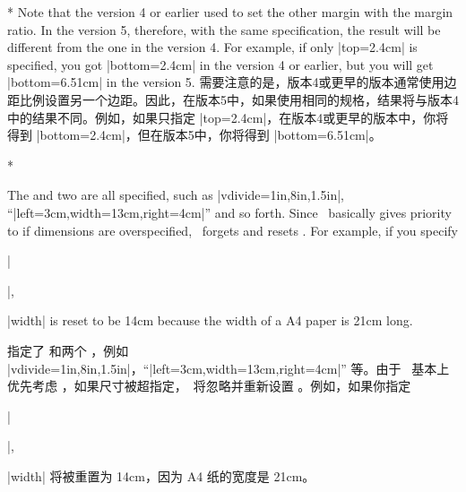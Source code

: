 \begin{Spec}
\begin{paracol}{2}
\switchcolumn[0]*
 Note that the version 4 or earlier used to set the other margin
 with the margin ratio. In the version 5, therefore, with the
 same specification, the result will be different from the one in the
 version 4. For example, if only |top=2.4cm| is specified, 
 you got |bottom=2.4cm| in the version 4 or earlier, but you will get
 |bottom=6.51cm| in the version 5.
 \bigskip
 \switchcolumn
 需要注意的是，版本4或更早的版本通常使用边距比例设置另一个边距。因此，在版本5中，如果使用相同的规格，结果将与版本4中的结果不同。例如，如果只指定 |top=2.4cm|，在版本4或更早的版本中，你将得到 |bottom=2.4cm|，但在版本5中，你将得到 |bottom=6.51cm|。
 \bigskip

\switchcolumn[0]*\item[\Ss(2,1)]
 The  and two  are all specified, such as
  |vdivide={1in,8in,1.5in}|, ``|left=3cm,width=13cm,right=4cm|'' and
  so forth. Since \Gm\ basically gives priority to 
  if dimensions are overspecified, \Gm\ forgets and resets
  . For example, if you specify
 \begin{center}
    |\usepackage[a4paper,left=3cm,width=13cm,right=4cm]{geometry}|,
 \end{center}
 |width| is reset to be 14cm because the width of a A4 paper is 21cm
 long.
 \switchcolumn
 \item[\Ss(2,1)]
指定了  和两个 ，例如 |vdivide={1in,8in,1.5in}|，``|left=3cm,width=13cm,right=4cm|'' 等。由于 \Gm\ 基本上优先考虑 ，如果尺寸被超指定，\Gm\ 将忽略并重新设置 。例如，如果你指定
 \begin{center}
    |\usepackage[a4paper,left=3cm,width=13cm,right=4cm]{geometry}|,
 \end{center}
 |width| 将被重置为 14cm，因为 A4 纸的宽度是 21cm。
\end{paracol}
 \end{Spec}

